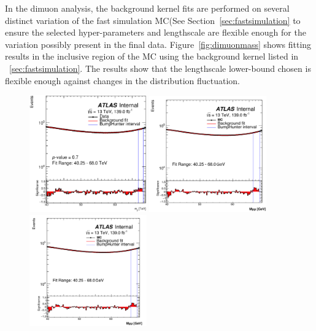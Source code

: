 In the dimuon analysis, the background kernel fits are performed on several distinct variation of the fast simulation MC(See Section~\ref{sec:fastsimulation} to ensure the selected hyper-parameters and lengthscale are flexible enough for the variation possibly present in the final data. Figure~\ref{fig:dimuonmass} shows fitting results in the inclusive region of the MC using the background kernel listed in ~\ref{sec:fastsimulation}. The results show that the lengthscale lower-bound chosen is flexible enough against changes in the distribution fluctuation. 


\begin{figure}[!htb]
    \begin{center}
        \includegraphics[width=0.45\textwidth]{figures/chapter_dimuon/nominal}        
        \includegraphics[width=0.45\textwidth]{figures/chapter_dimuon/up}        
        \includegraphics[width=0.45\textwidth]{figures/chapter_dimuon/down}        

\end{center}
\end{figure}
